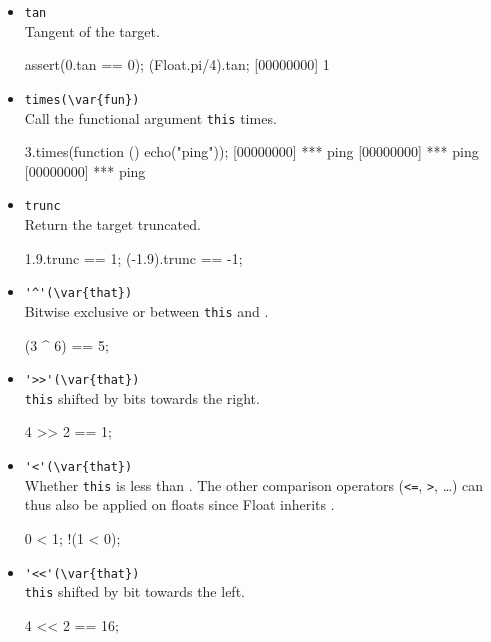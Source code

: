 \begin{itemize}
\item \lstinline|tan|\\
  Tangent of the target.
\begin{urbiscript}[firstnumber=last]
assert(0.tan == 0);
(Float.pi/4).tan;
[00000000] 1
\end{urbiscript}

\item \lstinline|times(\var{fun})|\\
  Call the functional argument  \lstinline|this| times.

\begin{urbiscript}[firstnumber=last]
3.times(function () { echo("ping")});
[00000000] *** ping
[00000000] *** ping
[00000000] *** ping
\end{urbiscript}

\item \lstinline|trunc|\\
  Return the target truncated.
\begin{urbiassert}[firstnumber=last]
1.9.trunc == 1;
(-1.9).trunc == -1;
\end{urbiassert}

\item \lstinline|'^'(\var{that})|\\
  Bitwise exclusive or between \lstinline|this| and .
\begin{urbiassert}[firstnumber=last]
(3 ^ 6) == 5;
\end{urbiassert}

\item \lstinline|'>>'(\var{that})|\\%
  \lstinline|this| shifted by  bits towards the right.
\begin{urbiassert}[firstnumber=last]
4 >> 2 == 1;
\end{urbiassert}

\item \lstinline|'<'(\var{that})|\\
  Whether \lstinline|this| is less than . The other comparison
  operators (\lstinline|<=|, \lstinline|>|, \ldots) can thus also be
  applied on floats since Float inherits .
\begin{urbiassert}[firstnumber=last]
  0 < 1;
!(1 < 0);
\end{urbiassert}

\item \lstinline|'<<'(\var{that})|\\
  \lstinline|this| shifted by  bit towards the left.
\begin{urbiassert}[firstnumber=last]
4 << 2 == 16;
\end{urbiassert}


\end{itemize}
